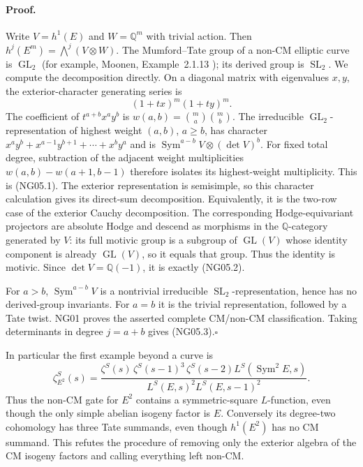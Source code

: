\documentclass[11pt]{article}
\theoremstyle{remark}
\begin{document}
\paragraph{Proof.}
Write $V=h^1(E)$ and $W=\mathbb Q^m$ with trivial action.
Then $h^j(E^m)=\bigwedge^j(V\otimes W)$.  The Mumford--Tate group
of a non-CM elliptic curve is $\operatorname{GL}_2$ (for example,
Moonen, Example~2.1.13 \cite{NGMoonen}); its derived group is $\operatorname{SL}_2$.
We compute the decomposition directly.  On a diagonal matrix with
eigenvalues $x,y$, the exterior-character generating series is
\[
                      (1+tx)^m(1+ty)^m.
\]
The coefficient of $t^{a+b}x^ay^b$ is
$w(a,b)=\binom ma\binom mb$.  The irreducible
$\operatorname{GL}_2$-representation of highest weight $(a,b)$,
$a\ge b$, has character
$x^ay^b+x^{a-1}y^{b+1}+\cdots+x^by^a$ and is
$\operatorname{Sym}^{a-b}V\otimes(\det V)^b$.
For fixed total degree, subtraction of the adjacent weight
multiplicities $w(a,b)-w(a+1,b-1)$ therefore isolates its highest-weight
multiplicity.  This is (NG05.1).  The exterior representation is
semisimple, so this character calculation gives its direct-sum
decomposition.  Equivalently, it is the two-row case of the exterior
Cauchy decomposition.  The corresponding Hodge-equivariant
projectors are absolute Hodge and descend as morphisms in the
$\mathbb Q$-category generated by $V$: its full motivic group is a
subgroup of $\operatorname{GL}(V)$ whose identity component is already
$\operatorname{GL}(V)$, so it equals that group.  Thus the identity is motivic.
Since $\det V=\mathbb Q(-1)$, it is exactly (NG05.2).

For $a>b$, $\operatorname{Sym}^{a-b}V$ is a nontrivial irreducible
$\operatorname{SL}_2$-representation, hence has no derived-group
invariants.  For $a=b$ it is the trivial representation, followed by
a Tate twist.  NG01 proves the asserted complete CM/non-CM
classification.  Taking determinants in degree $j=a+b$ gives
(NG05.3).\hfill$\square$

In particular the first example beyond a curve is
\[
 \zeta_{E^2}^S(s)=
 \frac{\zeta^S(s)\,\zeta^S(s-1)^3\,\zeta^S(s-2)
                        L^S(\operatorname{Sym}^2E,s)}
      {L^S(E,s)^2 L^S(E,s-1)^2}.                              \tag{NG05.4}
\]
Thus the non-CM gate for $E^2$ contains a symmetric-square
$L$-function, even though the only simple abelian isogeny factor is
$E$.  Conversely its degree-two cohomology has three Tate summands,
even though $h^1(E^2)$ has no CM summand.  This refutes the procedure
of removing only the exterior algebra of the CM isogeny factors and
calling everything left non-CM.
\end{document}
